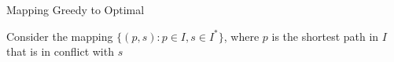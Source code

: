 \begin{frame}{Mapping Greedy to Optimal}

{Consider the mapping
$\{(p, s) : p \in I, s \in I^*\}$,
where $p$ is the shortest path in $I$ that is in conflict with $s$}



\end{frame}